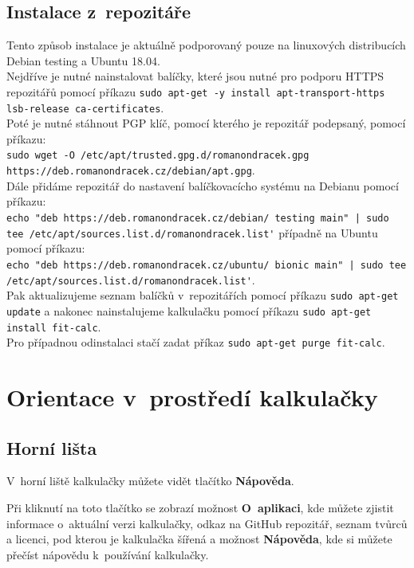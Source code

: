 \documentclass[11pt,a4paper,titlepage]{article}
\begin{document}
	\subsection{Instalace z~repozitáře}\label{instalace:repozitar}

	Tento způsob instalace je aktuálně podporovaný pouze na linuxových distribucích Debian testing a Ubuntu 18.04. \\
	Nejdříve je nutné nainstalovat balíčky, které jsou nutné pro podporu HTTPS repozitářů pomocí příkazu \texttt{sudo apt-get -y install apt-transport-https lsb-release ca-certificates}. \\

	Poté je nutné stáhnout PGP klíč, pomocí kterého je repozitář podepsaný, pomocí příkazu: \\ {\scriptsize\texttt{sudo wget -O /etc/apt/trusted.gpg.d/romanondracek.gpg https://deb.romanondracek.cz/debian/apt.gpg}}. \\
	Dále přidáme repozitář do nastavení balíčkovacícho systému na Debianu pomocí příkazu: \\ {\scriptsize\verb~echo "deb https://deb.romanondracek.cz/debian/ testing main" | sudo tee /etc/apt/sources.list.d/romanondracek.list'~} případně na Ubuntu pomocí příkazu: \\ {\scriptsize\verb~echo "deb https://deb.romanondracek.cz/ubuntu/ bionic main" | sudo tee /etc/apt/sources.list.d/romanondracek.list'~}. \\
	Pak aktualizujeme seznam balíčků v~repozitářích pomocí příkazu \texttt{sudo apt-get update} a nakonec nainstalujeme kalkulačku pomocí příkazu \texttt{sudo apt-get install fit-calc}.  \\
	Pro případnou odinstalaci stačí zadat příkaz \texttt{sudo apt-get purge fit-calc}. \\

	\newpage

	\section{Orientace v~prostředí kalkulačky}

	\subsection{Horní lišta}

	V~horní liště kalkulačky můžete vidět tlačítko \textbf{Nápověda}.

	Při kliknutí na toto tlačítko se zobrazí možnost \textbf{O~aplikaci}, kde můžete zjistit informace o~aktuální verzi kalkulačky, odkaz na GitHub repozitář, seznam tvůrců a licenci, pod kterou je kalkulačka šířená a možnost \textbf{Nápověda}, kde si můžete přečíst nápovědu k~používání kalkulačky.
\end{document}
